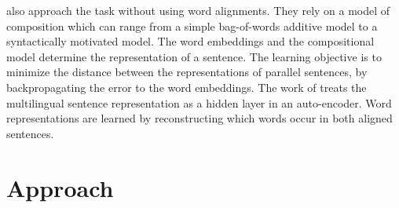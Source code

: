 \documentclass[a4paper,11pt]{article}
\begin{document}

\cite{hermann2014multilingual} also approach the task without using word alignments. They rely on a model of composition which can range from a simple bag-of-words additive model to a syntactically motivated model. The word embeddings and the compositional model determine the representation of a sentence. The learning objective is to minimize the distance between the representations of parallel sentences, by backpropagating the error to the word embeddings.
The work of \cite{sarath2014autoencoder} treats the multilingual sentence representation as a hidden layer in an auto-encoder. Word representations are learned by reconstructing which words occur in both aligned sentences. 





\section*{Approach}
\end{document}
